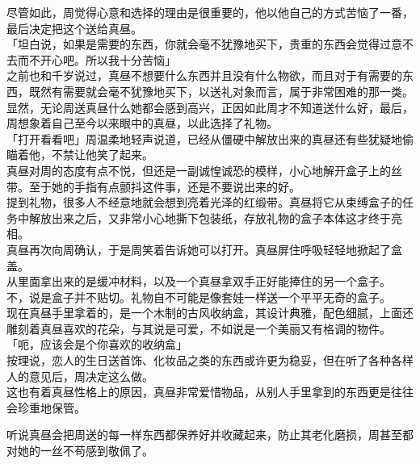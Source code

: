 尽管如此，周觉得心意和选择的理由是很重要的，他以他自己的方式苦恼了一番，最后决定把这个送给真昼。\\

「坦白说，如果是需要的东西，你就会毫不犹豫地买下，贵重的东西会觉得过意不去而不开心吧。所以我十分苦恼」\\

之前也和千岁说过，真昼不想要什么东西并且没有什么物欲，而且对于有需要的东西，既然有需要就会毫不犹豫地买下，以送礼对象而言，属于非常困难的那一类。\\

显然，无论周送真昼什么她都会感到高兴，正因如此周才不知道送什么好，最后，周想象着自己至今以来眼中的真昼，以此选择了礼物。\\

「打开看看吧」周温柔地轻声说道，已经从僵硬中解放出来的真昼还有些犹疑地偷瞄着他，不禁让他笑了起来。\\

真昼对周的态度有点不悦，但还是一副诚惶诚恐的模样，小心地解开盒子上的丝带。至于她的手指有点颤抖这件事，还是不要说出来的好。\\

提到礼物，很多人不经意地就会想到亮着光泽的红缎带。真昼将它从束缚盒子的任务中解放出来之后，又非常小心地撕下包装纸，存放礼物的盒子本体这才终于亮相。\\

真昼再次向周确认，于是周笑着告诉她可以打开。真昼屏住呼吸轻轻地掀起了盒盖。\\

从里面拿出来的是缓冲材料，以及一个真昼拿双手正好能捧住的另一个盒子。\\

不，说是盒子并不贴切。礼物自不可能是像套娃一样送一个平平无奇的盒子。\\

现在真昼手里拿着的，是一个木制的古风收纳盒，其设计典雅，配色细腻，上面还雕刻着真昼喜欢的花朵，与其说是可爱，不如说是一个美丽又有格调的物件。\\

「呃，应该会是个你喜欢的收纳盒」\\

按理说，恋人的生日送首饰、化妆品之类的东西或许更为稳妥，但在听了各种各样人的意见后，周决定这么做。\\

这也有着真昼性格上的原因，真昼非常爱惜物品，从别人手里拿到的东西更是往往会珍重地保管。

听说真昼会把周送的每一样东西都保养好并收藏起来，防止其老化磨损，周甚至都对她的一丝不苟感到敬佩了。\\

